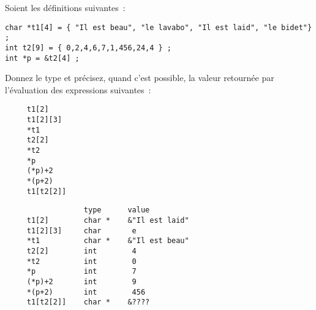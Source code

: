   Soient les d\'efinitions suivantes~:
\begin{verbatim}
char *t1[4] = { "Il est beau", "le lavabo", "Il est laid", "le bidet"} ;
int t2[9] = { 0,2,4,6,7,1,456,24,4 } ;
int *p = &t2[4] ;
\end{verbatim}
  Donnez le type et pr\'ecisez, quand c'est possible, la valeur
  retourn\'ee par l'\'evaluation des expressions suivantes~:
\begin{verbatim}
     t1[2]     
     t1[2][3]  
     *t1       
     t2[2]     
     *t2       
     *p        
     (*p)+2    
     *(p+2)    
     t1[t2[2]] 
\end{verbatim}
\ifcorrection
\begin{correction}
\begin{verbatim}
                  type      value
     t1[2]        char *    &"Il est laid"
     t1[2][3]     char       e
     *t1          char *    &"Il est beau" 
     t2[2]        int        4
     *t2          int        0
     *p           int        7
     (*p)+2       int        9
     *(p+2)       int        456
     t1[t2[2]]    char *    &????
\end{verbatim}
\end{correction}
\fi
